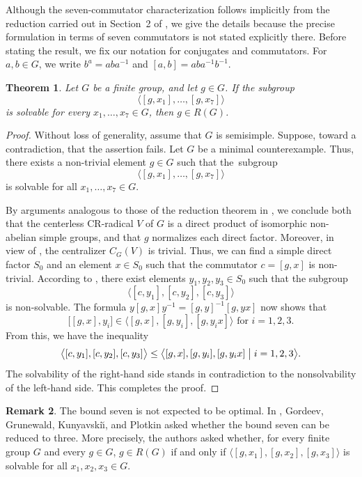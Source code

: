 \documentclass[11pt, reqno]{amsart}
\numberwithin{equation}{section}
\newtheorem{theorem}{Theorem}[section]
\theoremstyle{definition}
\newtheorem{Remark}[theorem]{Remark}
\numberwithin{equation}{section}
\begin{document}
Although the seven-commutator characterization follows implicitly from the reduction carried out in Section~2 of \cite{Gordeev08}, we give the details
because the precise formulation in terms of seven commutators is not stated explicitly there. Before stating the result, we fix our notation for  conjugates and commutators. For $a,b\in G$, we write
  $b^a=aba^{-1}$ and $[a,b]=aba^{-1}b^{-1}.$
\begin{theorem}\label{prop:7commutatorcriterion}
Let $G$ be a finite group, and let $g \in G$. If the subgroup $$\bigl\langle [g,x_1], \dots, [g,x_7] \bigr\rangle$$ is solvable for every $x_1, \dots, x_7 \in G$, then $g \in R(G)$.
\end{theorem}
\begin{proof}
Without loss of generality, assume that $ G $ is  semisimple. Suppose, toward a contradiction, that the assertion fails. Let $ G $ be a minimal counterexample. Thus, there exists a non-trivial element $ g\in G $ such that the~subgroup $$\langle[g,x_1],\dots,[g,x_7]\rangle$$ is solvable for all $ x_1,\dots,x_7\in G $.

By arguments analogous to those of the reduction theorem in \cite[Section~2]{Gordeev08}, we conclude both that the centerless CR-radical $V$ of $G$ is a direct product of isomorphic non-abelian simple groups, and that $g$ normalizes each direct factor. Moreover, in view of \cite[3.3.18(i)]{Robinson:CourseTheoryGroups}, the centralizer $C_G(V)$ is trivial. Thus, we can find a simple direct factor $S_0$ and an element $x \in S_0$ 
such that the commutator $c = [g,x]$ is non-trivial. According to \cite[Theorem 1.11]{Gordeev08}, there exist elements $y_1, y_2, y_3 \in S_0$ such that the subgroup 
$$\bigl\langle [c,y_1],[c,y_2],[c,y_3]\bigr\rangle$$ is non-solvable.
The formula $y[g,x]y^{-1}=[g,y]^{-1}[g,yx]$ now shows that 
$$\bigl[[g,x],y_i\bigr]\in\bigl\langle[g,x],[g,y_i],[g,y_ix]\bigr\rangle \text{ for } i=1,2,3.$$
From this, we have the inequality
$$\bigl\langle[c,y_1],[c,y_2],[c,y_3]\bigr\rangle
\leq
\bigl\langle[g,x],[g,y_i],[g,y_ix] \bigm| i=1,2,3\bigr\rangle.$$
The solvability of the right-hand side stands in contradiction to the nonsolvability of the left-hand side. This completes the proof.
\end{proof}

\begin{Remark}
The bound seven is not expected to be optimal. In \cite{Gordeev08}, Gordeev, Grunewald, Kunyavski\u{\i}, and Plotkin
asked whether the bound seven can be reduced to three. More precisely, the authors asked whether, for every finite group $G$ and every $g\in G$, $g\in R(G)$ if and only if $\langle [g,x_1],[g,x_2],[g,x_3]\rangle$  is solvable for all $x_1,x_2,x_3\in G.$
\end{Remark}
\end{document}
